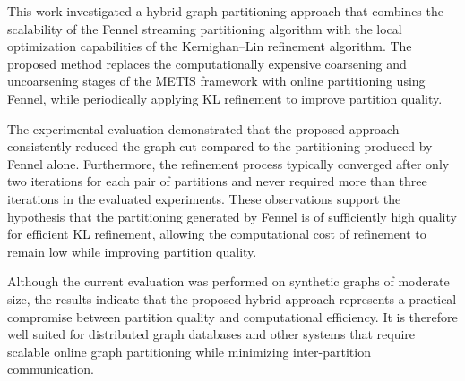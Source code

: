 This work investigated a hybrid graph partitioning approach that combines the scalability of the Fennel streaming partitioning algorithm with the local optimization capabilities of the Kernighan--Lin refinement algorithm. The proposed method replaces the computationally expensive coarsening and uncoarsening stages of the METIS framework with online partitioning using Fennel, while periodically applying KL refinement to improve partition quality.

The experimental evaluation demonstrated that the proposed approach consistently reduced the graph cut compared to the partitioning produced by Fennel alone. Furthermore, the refinement process typically converged after only two iterations for each pair of partitions and never required more than three iterations in the evaluated experiments. These observations support the hypothesis that the partitioning generated by Fennel is of sufficiently high quality for efficient KL refinement, allowing the computational cost of refinement to remain low while improving partition quality.

Although the current evaluation was performed on synthetic graphs of moderate size, the results indicate that the proposed hybrid approach represents a practical compromise between partition quality and computational efficiency. It is therefore well suited for distributed graph databases and other systems that require scalable online graph partitioning while minimizing inter-partition communication.
